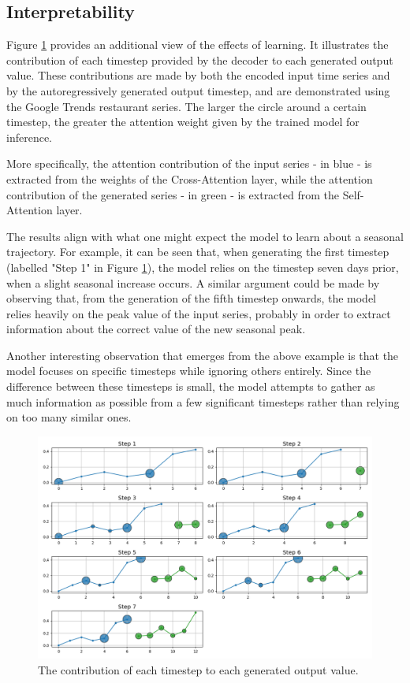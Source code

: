 \documentclass[algorithms,article,submit,pdftex,moreauthors]{Definitions/mdpi}
\begin{document}
{\subsection{Interpretability}

Figure \ref{fig:attention} provides an additional view of the effects of learning. It illustrates the contribution of each timestep provided by the decoder  to each generated output value. These contributions are made by both the encoded input time series and by the autoregressively generated output timestep, and are demonstrated using the Google Trends restaurant series. The larger the circle around a certain timestep, the greater the attention weight given by the trained model for inference.

More specifically, the attention contribution of the input series - in blue - is extracted from the weights of the Cross-Attention layer, while the attention contribution of the generated series - in green - is extracted from the Self-Attention layer.

The results align with what one might expect the model to learn about a seasonal trajectory. For example, it can be seen that, when generating the first timestep (labelled "Step 1" in Figure \ref{fig:attention}), the model relies on the timestep seven days prior, when a slight seasonal increase occurs. A similar argument could be made by observing that, from the generation of the fifth timestep onwards, the model relies heavily on the peak value of the input series, probably in order to extract information about the correct value of the new seasonal peak.

Another interesting observation that emerges from the above example is that the model focuses on specific timesteps while ignoring others entirely. Since the difference between these timesteps is small, the model attempts to gather as much information as possible from a few significant timesteps rather than relying on too many similar ones.

\begin{figure}
	\centering
	\includegraphics[width=1.0\linewidth]{attention.png}
	\caption{The contribution of each timestep to each generated output value.}
	\label{fig:attention}
\end{figure}
}
\end{document}
